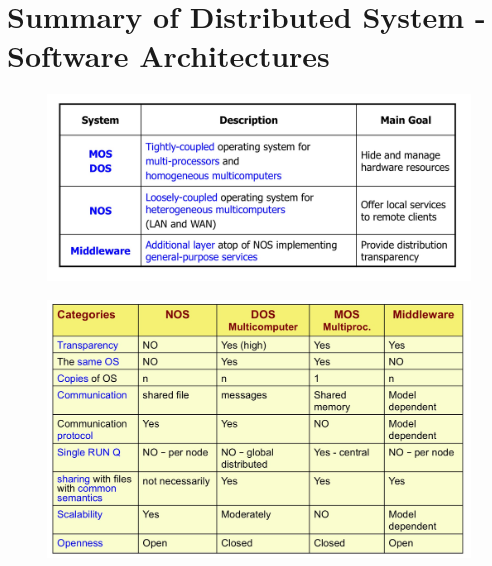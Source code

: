 \section{Summary of Distributed System - Software Architectures}
\begin{figure}[!h]
            \centering
            \includegraphics[width=.9\linewidth]{images/distributedSystem/summary1.jpeg}
    \end{figure}
\begin{figure}[!h]
            \centering
            \includegraphics[width=.9\linewidth]{images/distributedSystem/summary2.jpeg}
    \end{figure}